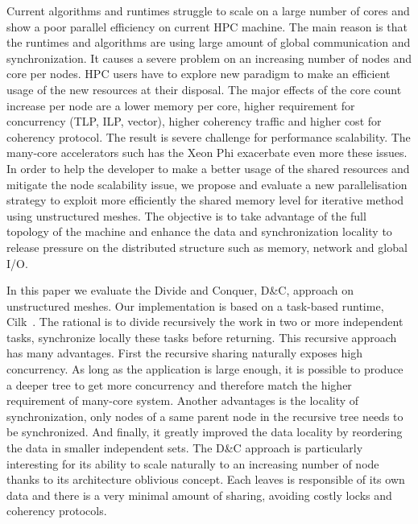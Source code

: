 \documentclass{IOS-Book-Article}
\begin{document}
Current algorithms and runtimes struggle to scale on a large number of cores and show a poor parallel efficiency on current HPC machine. The main reason is that the runtimes
and algorithms are using large amount of global communication and synchronization. It causes a severe problem on an increasing number of nodes and core per nodes.
HPC users have to explore new paradigm to make an efficient usage of the new resources at their disposal. 
The major effects of the core count increase per node are a lower memory per core, higher requirement for concurrency (TLP, ILP, vector), higher coherency traffic and higher
cost for coherency protocol. The result is severe challenge for performance scalability. The many-core accelerators such has the Xeon Phi exacerbate even more these issues. 
In order to help the developer to make a better usage of the shared resources and mitigate the node scalability issue, we propose and evaluate a new parallelisation strategy 
 to exploit more efficiently the shared memory level for iterative method using unstructured meshes. The objective is to take advantage of the full topology of the machine and
 enhance the data and synchronization locality to release pressure on the distributed structure such as memory, network and global I/O. 

In this paper we evaluate the Divide and Conquer, D\&C, approach on  unstructured meshes. Our implementation is based on a task-based runtime, Cilk~\cite{cilk5}.
The rational is to divide recursively the work in two or more independent tasks, synchronize locally these tasks before returning. This recursive approach has many advantages.
First the recursive sharing naturally exposes high concurrency. As long as the application is large enough, it is possible to produce a deeper tree to get more concurrency
and therefore match the higher requirement of many-core system. Another advantages is the locality of synchronization, only nodes of a same parent node in the recursive
tree needs to be synchronized. And finally, it greatly improved the data locality by reordering the data in smaller independent sets. The D\&C approach is particularly
interesting for its ability to scale naturally to an increasing number of node thanks to its architecture oblivious concept.
Each leaves is responsible of its own data and there is a very minimal amount of sharing, avoiding costly locks and coherency protocols. 
\end{document}

